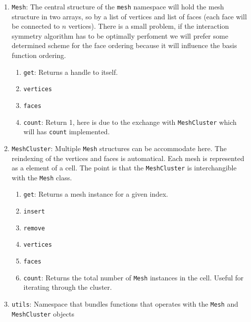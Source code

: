 \documentclass[9pt]{article}
\begin{document}
\begin{enumerate}[label=\Roman*.]
\begin{enumerate}[label=\roman*.]
            \item \texttt{count}: Return 1, here is due to the exchange with \texttt{MeshCluster} which will has \texttt{count} implemented.
        \end{enumerate}
        \item \texttt{Mesh}: The central structure of the \texttt{mesh} namespace will hold the mesh structure in two arrays, so by a list of vertices and list of faces (each face will be connected to $n$ vertices). There is a small problem, if the interaction symmetry algorithm has to be optimally perfoment we will prefer some determined scheme for the face ordering because it will influence the basis function ordering.
        \begin{enumerate}[label=\roman*.]
            \item \texttt{get}: Returns a handle to itself.
            \item \texttt{vertices}
            \item \texttt{faces}
            \item \texttt{count}: Return 1, here is due to the exchange with \texttt{MeshCluster} which will has \texttt{count} implemented.
        \end{enumerate}
        \item \texttt{MeshCluster}: Multiple \texttt{Mesh} structures can be accommodate here. The reindexing of the vertices and faces is automatical. Each mesh is represented as a element of a cell. The point is that the \texttt{MeshCluster} is interchangible with the \texttt{Mesh} class.
        \begin{enumerate}[label=\roman*.]
            \item \texttt{get}: Returns a mesh instance for a given index.
            \item \texttt{insert}
            \item \texttt{remove}
            \item \texttt{vertices}
            \item \texttt{faces}
            \item \texttt{count}: Returns the total number of \texttt{Mesh} instances in the cell. Useful for iterating through the cluster.
        \end{enumerate}
        \item \texttt{utils}: Namespace that bundles functions that operates with the \texttt{Mesh} and \texttt{MeshCluster} objects
        \begin{enumerate}[label=\roman*.]

\end{enumerate}
\end{enumerate}
\end{document}

